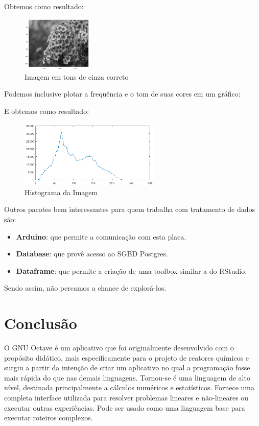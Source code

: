 \documentclass[a4paper,11pt]{article}
\begin{document}
Obtemos como resultado:
\begin{figure}[H]
	\centering
	\includegraphics[width=0.3\textwidth]{imagem/azaleiag2}
	\caption{Imagem em tons de cinza correto}
\end{figure}

Podemos inclusive plotar a frequência e o tom de suas cores em um gráfico: \\

E obtemos como resultado:
\begin{figure}[H]
	\centering
	\includegraphics[width=0.6\textwidth]{imagem/azaleiHist}
	\caption{Histograma da Imagem}
\end{figure}

Outros pacotes bem interessantes para quem trabalha com tratamento de dados são: \vspace{-1em}
\begin{itemize}
	\item \textbf{Arduino}: que permite a comunicação com esta placa.
	\item \textbf{Database}: que provê acesso ao SGBD Postgres.
	\item \textbf{Dataframe}: que permite a criação de uma toolbox similar a do RStudio.
\end{itemize}

Sendo assim, não percamos a chance de explorá-los.

\section{Conclusão}
O GNU Octave é um aplicativo que foi originalmente desenvolvido com o propósito didático, mais especificamente para o projeto de reatores químicos e surgiu a partir da intenção de criar um aplicativo no qual a programação fosse mais rápida do que nas demais linguagens. Tornou-se é uma linguagem de alto nível, destinada principalmente a cálculos numéricos e estatísticos. Fornece uma completa interface utilizada para resolver problemas lineares e não-lineares ou executar outras experiências. Pode ser usado como uma linguagem base para executar roteiros complexos.
\end{document}
